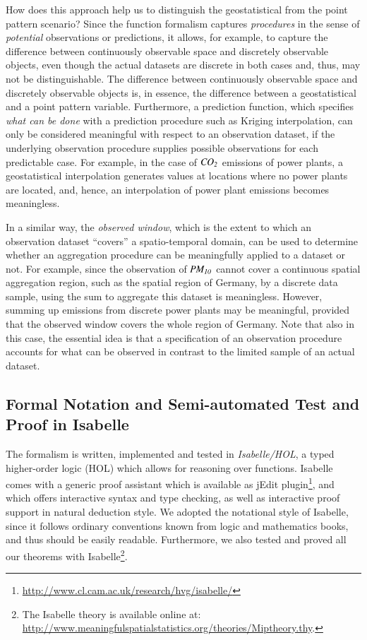 \documentclass[final,authoryear,1p,times]{elsarticle}
\begin{document}
How does this approach help us to distinguish the geostatistical from the point pattern scenario? Since the function formalism captures \textit{procedures} in the sense of \textit{potential} observations or predictions, it allows, for example, to capture the difference between continuously observable space and discretely observable objects, even though the actual datasets are discrete in both cases and, thus, may not be distinguishable. The difference between continuously observable space and discretely observable objects is, in essence, the difference between a geostatistical and a point pattern variable. Furthermore, a prediction function, which specifies \textit{what can be done} with a prediction procedure such as Kriging interpolation, can only be considered meaningful with respect to an observation dataset, if the underlying observation procedure supplies possible observations for each predictable case. For example, in the case of ${\it CO_{2}}$ emissions of power plants, a geostatistical interpolation generates values at locations where no power plants are located, and, hence, an interpolation of power plant emissions becomes meaningless.

In a similar way, the \textit{observed window}, which is the extent to which an observation dataset ``covers'' a spatio-temporal domain, can be used to determine whether an aggregation procedure can be meaningfully applied to a dataset or not. For example, since the observation of ${\it PM_{10}}$ cannot cover a continuous spatial aggregation region, such as the spatial region of Germany, by a discrete data sample, using the sum to aggregate this dataset is meaningless. However, summing up emissions from discrete power plants may be meaningful, provided that the observed window covers the whole region of Germany. Note that also in this case, the essential idea is that a specification of an observation procedure accounts for what can be observed in contrast to the limited sample of an actual dataset.

\subsection{Formal Notation and Semi-automated Test and Proof in Isabelle}
\label{notationIsabelle}

The formalism is written, implemented and tested in \textit{Isabelle/HOL}, a typed higher-order logic (HOL) which allows for reasoning over functions. Isabelle comes with a generic proof assistant which is available as jEdit plugin\footnote{\url{http://www.cl.cam.ac.uk/research/hvg/isabelle/}}, and which offers interactive syntax and type checking, as well as interactive proof support in natural deduction style. We adopted the notational style of Isabelle, since it follows ordinary conventions known from logic and mathematics books, and thus should be easily readable. Furthermore, we also tested and proved all our theorems with Isabelle\footnote{The Isabelle theory is available online at: \url{http://www.meaningfulspatialstatistics.org/theories/Miptheory.thy}.}. 
\end{document}
